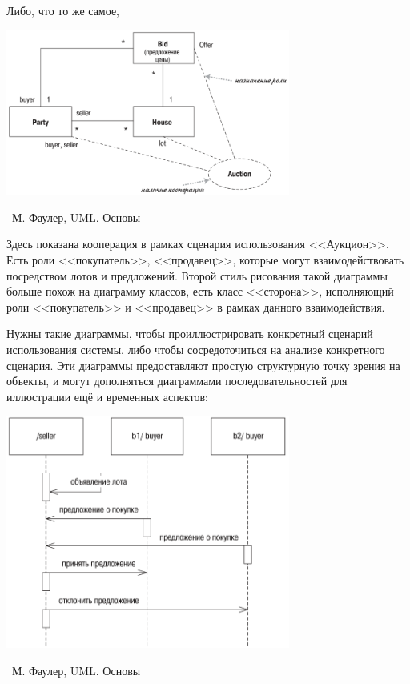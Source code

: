 \documentclass[a5paper]{article}
\newcommand{\attribution}[1] {
	\vspace{-5mm}\begin{flushright}\begin{scriptsize}%
	{\textcopyright\, #1}\end{scriptsize}\end{flushright}
}
\begin{document}
Либо, что то же самое,

\begin{center}
	\includegraphics[width=0.7\textwidth]{cooperationAlternateNotation.png}
	\attribution{М. Фаулер, UML. Основы}
\end{center}

Здесь показана кооперация в рамках сценария использования <<Аукцион>>. Есть роли <<покупатель>>, <<продавец>>, которые могут взаимодействовать посредством лотов и предложений. Второй стиль рисования такой диаграммы больше похож на диаграмму классов, есть класс <<сторона>>, исполняющий роли <<покупатель>> и <<продавец>> в рамках данного взаимодействия.

Нужны такие диаграммы, чтобы проиллюстрировать конкретный сценарий использования системы, либо чтобы сосредоточиться на анализе конкретного сценария. Эти диаграммы предоставляют простую структурную точку зрения на объекты, и могут дополняться диаграммами последовательностей для иллюстрации ещё и временных аспектов:

\begin{center}
	\includegraphics[width=0.7\textwidth]{cooperationSequenceDiagram.png}
	\attribution{М. Фаулер, UML. Основы}
\end{center}
\end{document}
